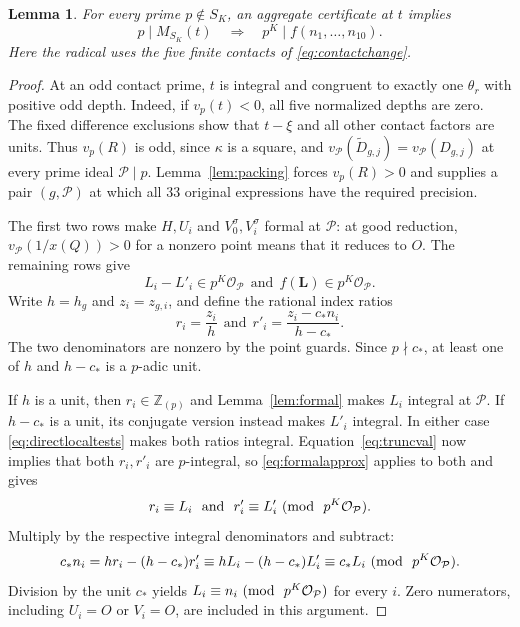 \documentclass[11pt,reqno]{amsart}
\newtheorem{lemma}[theorem]{Lemma}
\theoremstyle{definition}
\numberwithin{equation}{section}
\newcommand{\Z}{\mathbb Z}
\newcommand{\OO}{\mathcal O}
\def\t{\text}
\def\f{\frac}
\def\mo{{\rm{mod}\ }}
\def\pmod#1{\ (\mo\ #1)}
\begin{document}
\begin{lemma}\label{lem:local}
For every prime $p\notin S_K$, an aggregate certificate at $t$ implies
\begin{equation}\label{eq:localcongruence}
 p\mid M_{S_K}(t)\quad\Longrightarrow\quad
 p^K\mid f(n_1,\ldots,n_{10}).
\end{equation}
Here the radical uses the five finite contacts of \eqref{eq:contactchange}.
\end{lemma}
\begin{proof}
At an odd contact prime, $t$ is integral and congruent to exactly one $\theta_r$ with positive odd depth. Indeed, if $v_p(t)<0$, all five normalized depths are zero. The fixed difference exclusions show that $t-\xi$ and all other contact factors are units. Thus $v_p(R)$ is odd, since $\kappa$ is a square, and $v_{\mathcal P}(\widetilde D_{g,j})=v_{\mathcal P}(D_{g,j})$ at every prime ideal ${\mathcal P}\mid p$. Lemma~\ref{lem:packing} forces $v_p(R)>0$ and supplies a pair $(g,{\mathcal P})$ at which all 33 original expressions have the required precision. 

The first two rows make $H,U_i$ and $V_0^\sigma,V_i^\sigma$ formal at ${\mathcal P}$: at good reduction, $v_{\mathcal P}(1/x(Q))>0$ for a nonzero point means that it reduces to $O$. The remaining rows give
\begin{equation}\label{eq:directlocaltests}
 L_i-L'_i\in p^K\OO_{\mathcal P}\ \ \t{and} \ \ f(\mathbf L)\in p^K\OO_{\mathcal P}.
\end{equation}
Write $h=h_g$ and $z_i=z_{g,i}$, and define the rational index ratios
\[
 r_i=\f{z_i}h\ \ \t{and}\ \ r'_i=\f{z_i-c_\ast n_i}{h-c_\ast}.
\]
The two denominators are nonzero by the point guards. Since $p\nmid c_\ast$, at least one of $h$ and $h-c_\ast$ is a $p$-adic unit.

If $h$ is a unit, then $r_i\in\Z_{(p)}$ and Lemma~\ref{lem:formal} makes $L_i$ integral at $\mathcal P$. If $h-c_\ast$ is a unit, its conjugate version instead makes $L'_i$ integral. In either case \eqref{eq:directlocaltests} makes both ratios integral. Equation~\eqref{eq:truncval} now implies that both $r_i,r'_i$ are $p$-integral, so \eqref{eq:formalapprox} applies to both and gives
\[
 r_i\equiv L_i\ \ \t{and}\ \ r'_i\equiv L'_i\pmod{p^K\OO_{\mathcal P}}.
\]
Multiply by the respective integral denominators and subtract:
\begin{equation*}
 c_\ast n_i
 =h r_i-(h-c_\ast)r'_i
 \equiv hL_i-(h-c_\ast)L'_i
 \equiv c_\ast L_i\pmod{p^K\OO_{\mathcal P}}.
\end{equation*}
Division by the unit $c_\ast$ yields $L_i\equiv n_i\pmod{p^K\OO_{\mathcal P}}$ for every $i$. Zero numerators, including $U_i=O$ or $V_i=O$, are included in this argument.


\end{proof}
\end{document}
